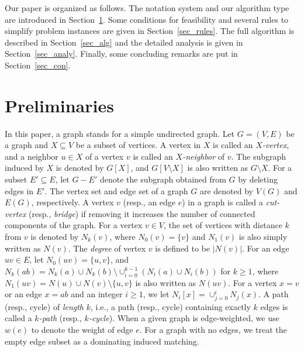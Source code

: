 \documentclass{elsart_TR2}
\begin{document}
Our paper is organized as follows. The notation system and our algorithm type are introduced in Section~\ref{sec_pre}.
Some conditions for feasibility and several rules to simplify problem  instances are given in Section~\ref{sec_rules}. The full algorithm is described in Section~\ref{sec_alg} and
the detailed analysis is given in Section~\ref{sec_analy}.
Finally, some concluding remarks are put in Section~\ref{sec_con}.



\section{Preliminaries}
\label{sec_pre}
In this paper, a graph stands for a simple undirected graph.
Let $G=(V,E)$ be a graph and $X\subseteq V$ be a subset of vertices.
A vertex in $X$ is called an \emph{$X$-vertex},
and a neighbor $u\in X$ of a vertex $v$ is called an \emph{$X$-neighbor} of $v$.
The subgraph induced by $X$ is denoted by $G[X]$, and $G[V\setminus X]$ is also written as $G\setminus X$.
For a subset $E'\subseteq E$, let $G-E'$ denote the subgraph obtained from $G$ by deleting edges in $E'$.
The vertex set and edge set of a graph $G$ are denoted by $V(G)$ and $E(G)$, respectively.
A vertex $v$ (resp., an edge $e$) in a graph is called a \emph{cut-vertex} (resp., \emph{bridge})
 if removing it increases the number of connected components of the graph.
For a vertex $v\in V$,  the set of vertices with distance $k$ from $v$ is denoted by $N_k(v)$, where $N_0(v)=\{v\}$ and $N_1(v)$ is also simply written as $N(v)$. The \emph{degree} of vertex $v$ is defined to be $|N(v)|$.
For an edge $uv \in E$, let $N_0(uv)=\{u,v\}$,
 and $N_k(ab)=N_k(a)\cup N_k(b)\setminus\cup_{i=0}^{k-1}(N_i(a)\cup N_i(b))$ for $k\geq 1$,
where $N_1(uv)=N(u)\cup N(v)\setminus \{u,v\}$ is also written as $N(uv)$.
For a vertex $x=v$ or an edge $x=ab$ and an integer $i\geq 1$, we let $N_i[x]=\cup_{j=0}^i N_j(x) $.
A path (resp., cycle) of \emph{length} $k$, i.e., a path (resp., cycle) containing exactly $k$ edges is called
 a  \emph{$k$-path} (resp., \emph{$k$-cycle}).
When a given graph is  edge-weighted, we use $w(e)$ to denote the weight of edge $e$.
For a graph with no edges, we treat the empty edge subset as a dominating induced matching.
\end{document}
